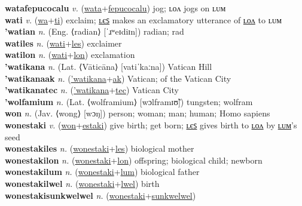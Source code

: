\textbf{watafepucocalu} \textit{v.} (\hyperref[wata]{wata}+\hyperref[fepucocalu]{fepucocalu})
jog; ʟᴏᴧ jogs on ʟᴜᴍ \label{watafepucocalu} \\
\textbf{wati} \textit{v.} (\hyperref[wa]{wa}+\hyperref[ti]{ti})
exclaim; \hyperref[watiles]{ʟєꜱ} makes an exclamatory utterance of \hyperref[watilon]{ʟᴏᴧ} to ʟᴜᴍ \label{wati} \\
\textbf{'watian} \textit{n.} (Eng. ⟨radian⟩ [ˈɹʷeɪdiɪn])
radian; rad \label{'watian} \\
\textbf{watiles} \textit{n.} (\hyperref[wati]{wati}+\hyperref[les]{les})
exclaimer \label{watiles} \\
\textbf{watilon} \textit{n.} (\hyperref[wati]{wati}+\hyperref[lon]{lon})
exclamation \label{watilon} \\
\textbf{'watikana} \textit{n.} (Lat. ⟨Vāticāna⟩ [vatiˈkaːna])
Vatican Hill \label{'watikana} \\
\textbf{'watikanaak} \textit{n.} (\hyperref['watikana]{'watikana}+\hyperref[ak]{ak})
Vatican; of the Vatican City \label{'watikanaak} \\
\textbf{'watikanatec} \textit{n.} (\hyperref['watikana]{'watikana}+\hyperref[tec]{tec})
Vatican City \label{'watikanatec} \\
\textbf{'wolfamium} \textit{n.} (Lat. ⟨wolframium⟩ [wɔlframɪʊ̃])
tungsten; wolfram \label{'wolfamium} \\
\textbf{won} \textit{n.} (Jav. ⟨wong⟩ [wɔŋ])
person; woman; man; human; Homo sapiens \label{won} \\
\textbf{wonestaki} \textit{v.} (\hyperref[won]{won}+\hyperref[estaki]{estaki})
give birth; get born; \hyperref[wonestakiles]{ʟєꜱ} gives birth to \hyperref[wonestakilon]{ʟᴏᴧ} by \hyperref[wonestakilum]{ʟᴜᴍ}’s seed \label{wonestaki} \\
\textbf{wonestakiles} \textit{n.} (\hyperref[wonestaki]{wonestaki}+\hyperref[les]{les})
biological mother \label{wonestakiles} \\
\textbf{wonestakilon} \textit{n.} (\hyperref[wonestaki]{wonestaki}+\hyperref[lon]{lon})
offspring; biological child; newborn \label{wonestakilon} \\
\textbf{wonestakilum} \textit{n.} (\hyperref[wonestaki]{wonestaki}+\hyperref[lum]{lum})
biological father \label{wonestakilum} \\
\textbf{wonestakilwel} \textit{n.} (\hyperref[wonestaki]{wonestaki}+\hyperref[lwel]{lwel})
birth \label{wonestakilwel} \\
\textbf{wonestakisunkwelwel} \textit{n.} (\hyperref[wonestaki]{wonestaki}+\hyperref[sunkwelwel]{sunkwelwel})
